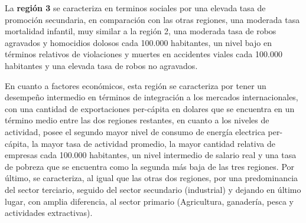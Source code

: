 \documentclass[12pt,a4paper]{article}
\begin{document}
La \textbf{región 3} se caracteriza en terminos sociales por una elevada tasa de promoción secundaria, en comparación con las otras regiones, una moderada tasa mortalidad infantil, muy similar a la región 2, una moderada tasa de robos agravados y homocidios dolosos cada 100.000 habitantes, un nivel bajo en términos relativos de violaciones y muertes en accidentes viales cada 100.000 habitantes y una elevada tasa de robos no agravados. 

En cuanto a factores económicos, esta región se caracteriza por tener un desempeño intermedio en términos de integración a los mercados internacionales, con una cantidad de exportaciones per-cápita en dolares que se encuentra en un término medio entre las dos regiones restantes, en cuanto a los niveles de actividad, posee el segundo mayor nivel de consumo  de energía electrica per-cápita, la mayor tasa de actividad promedio, la mayor cantidad relativa de empresas cada 100.000 habitantes, un nivel intermedio de salario real  y una tasa de pobreza que se encuentra como la segunda más baja de las tres regiones. Por último, se caracteriza, al igual que las otras dos regiones, por una predominancia del sector terciario, seguido del sector secundario (industrial) y dejando en último lugar, con amplia diferencia, al sector primario (Agricultura, ganadería, pesca y actividades extractivas).
\end{document}
